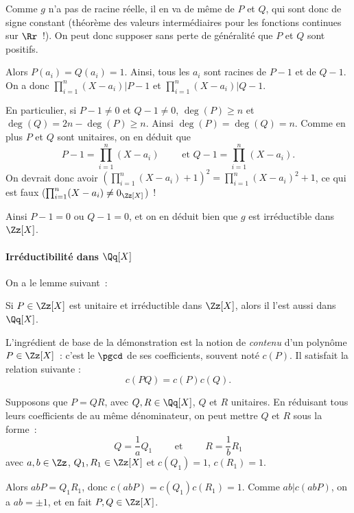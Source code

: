 {{  Comme $g$ n'a pas de racine réelle, il en va de même de $P$ et $Q$, qui
  sont donc de signe constant (théorème des valeurs intermédiaires pour
  les fonctions continues sur $\Rr$~!). On peut donc supposer sans perte
  de généralité que $P$ et $Q$ sont positifs.

  Alors $P(a_{i})=Q(a_{i})=1$. Ainsi, tous les $a_{i}$ sont racines de
  $P-1$ et de $Q-1$. On a donc $\prod_{i=1}^{n}(X-a_{i})|P-1$ et
  $\prod_{i=1}^{n}(X-a_{i})|Q-1$.

  En particulier, si $P-1\neq0$ et $Q-1\neq0$, $\deg(P)\geq n$ et
  $\deg(Q)=2n-\deg(P)\geq n$. Ainsi $\deg(P)=\deg(Q)=n$. Comme en plus
  $P$ et $Q$ sont unitaires, on en déduit que 
  $$
    P-1=\prod_{i=1}^{n}(X-a_{i}) \qquad\text{ et }
    Q-1=\prod_{i=1}^{n}(X-a_{i}).
  $$
  On devrait donc avoir
  $(\prod_{i=1}^{n}(X-a_{i})+1)^{2}=\prod_{i=1}^{n}(X-a_{i})^{2}+1$, ce
  qui est faux ($\prod_{i=1}^{n}(X-a_{i})\neq 0_{\Zz[X]}$)~!

  Ainsi $P-1=0$ ou $Q-1=0$, et on en déduit bien que $g$ est irréductible
  dans $\Zz[X]$.


  
  \bigskip
  \paragraph{Irréductibilité dans $\Qq[X]$}
 On a le lemme suivant~:

  Si $P\in\Zz[X]$ est unitaire et irréductible dans $\Zz[X]$, alors il
  l'est aussi dans $\Qq[X]$.

  L'ingrédient de base de la démonstration est la notion de
  \emph{contenu} d'un polynôme $P\in\Zz[X]$~: c'est le $\pgcd$ de ses
  coefficients, souvent noté $c(P)$. Il satisfait la relation suivante :
  $$
    c(PQ)=c(P)c(Q).
  $$

  Supposons que $P=QR$, avec $Q,R\in\Qq[X]$, $Q$ et $R$ unitaires. En
  réduisant tous leurs coefficients de au même dénominateur, on peut
  mettre $Q$ et $R$ sous la forme~:
  $$
    Q=\frac{1}{a}Q_{1} 
    \qquad\text{ et }\qquad
    R=\frac{1}{b}R_{1} 
  $$
  avec $a,b\in\Zz$, $Q_{1},R_{1}\in\Zz[X]$ et $c(Q_{1})=1$, $c(R_{1})=1$.

  Alors $abP=Q_{1}R_{1}$, donc $c(abP)=c(Q_{1})c(R_{1})=1$. Comme
  $ab|c(abP)$, on a $ab=\pm1$, et en fait $P,Q\in\Zz[X]$.}
}